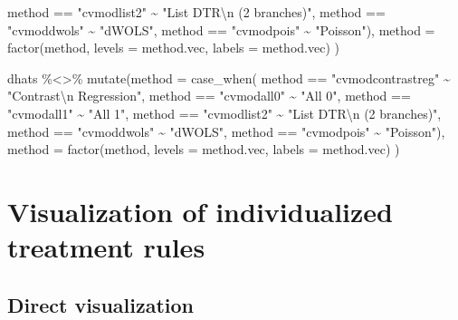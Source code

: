 \documentclass[
  letterpaper,
  DIV=11,
  numbers=noendperiod]{scrreprt}
\newenvironment{Shaded}{\begin{snugshade}}{\end{snugshade}}
\newcommand{\AttributeTok}[1]{\textcolor[rgb]{0.40,0.45,0.13}{#1}}
\newcommand{\FunctionTok}[1]{\textcolor[rgb]{0.28,0.35,0.67}{#1}}
\newcommand{\NormalTok}[1]{\textcolor[rgb]{0.00,0.23,0.31}{#1}}
\newcommand{\SpecialCharTok}[1]{\textcolor[rgb]{0.37,0.37,0.37}{#1}}
\newcommand{\StringTok}[1]{\textcolor[rgb]{0.13,0.47,0.30}{#1}}
\begin{document}
\begin{Shaded}
\begin{Highlighting}[]
\NormalTok{    method }\SpecialCharTok{==} \StringTok{"cvmodlist2"} \SpecialCharTok{\textasciitilde{}} \StringTok{"List DTR}\SpecialCharTok{\textbackslash{}n}\StringTok{ (2 branches)"}\NormalTok{,}
\NormalTok{    method }\SpecialCharTok{==} \StringTok{"cvmoddwols"} \SpecialCharTok{\textasciitilde{}} \StringTok{"dWOLS"}\NormalTok{,}
\NormalTok{    method }\SpecialCharTok{==} \StringTok{"cvmodpois"} \SpecialCharTok{\textasciitilde{}} \StringTok{"Poisson"}\NormalTok{),}
    \AttributeTok{method =} \FunctionTok{factor}\NormalTok{(method,}
                    \AttributeTok{levels =}\NormalTok{ method.vec,}
                    \AttributeTok{labels =}\NormalTok{ method.vec)}
\NormalTok{  )}

\NormalTok{dhats }\SpecialCharTok{\%\textless{}\textgreater{}\%}
  \FunctionTok{mutate}\NormalTok{(}\AttributeTok{method =} \FunctionTok{case\_when}\NormalTok{(}
\NormalTok{    method }\SpecialCharTok{==} \StringTok{"cvmodcontrastreg"} \SpecialCharTok{\textasciitilde{}} \StringTok{"Contrast}\SpecialCharTok{\textbackslash{}n}\StringTok{ Regression"}\NormalTok{,}
\NormalTok{    method }\SpecialCharTok{==} \StringTok{"cvmodall0"} \SpecialCharTok{\textasciitilde{}} \StringTok{"All 0"}\NormalTok{,}
\NormalTok{    method }\SpecialCharTok{==} \StringTok{"cvmodall1"} \SpecialCharTok{\textasciitilde{}} \StringTok{"All 1"}\NormalTok{,}
\NormalTok{    method }\SpecialCharTok{==} \StringTok{"cvmodlist2"} \SpecialCharTok{\textasciitilde{}} \StringTok{"List DTR}\SpecialCharTok{\textbackslash{}n}\StringTok{ (2 branches)"}\NormalTok{,}
\NormalTok{    method }\SpecialCharTok{==} \StringTok{"cvmoddwols"} \SpecialCharTok{\textasciitilde{}} \StringTok{"dWOLS"}\NormalTok{,}
\NormalTok{    method }\SpecialCharTok{==} \StringTok{"cvmodpois"} \SpecialCharTok{\textasciitilde{}} \StringTok{"Poisson"}\NormalTok{),}
    \AttributeTok{method =} \FunctionTok{factor}\NormalTok{(method,}
                    \AttributeTok{levels =}\NormalTok{ method.vec,}
                    \AttributeTok{labels =}\NormalTok{ method.vec)}
\NormalTok{  )}
\end{Highlighting}
\end{Shaded}

\hypertarget{visualization-of-individualized-treatment-rules}{%
\section{Visualization of individualized treatment
rules}\label{visualization-of-individualized-treatment-rules}}

\hypertarget{direct-visualization}{%
\subsection{Direct visualization}\label{direct-visualization}}
\end{document}
